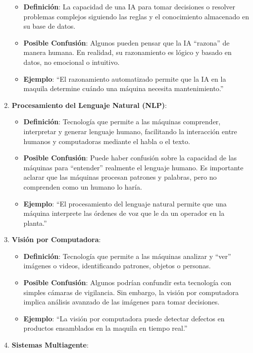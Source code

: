 \documentclass[
  10pt,
  letterpaper,
]{book}
\providecommand{\tightlist}{%
  \setlength{\itemsep}{0pt}\setlength{\parskip}{0pt}}\usepackage{longtable,booktabs,array}
\begin{document}
\begin{enumerate}
  \begin{itemize}
  \tightlist
  \item
    \textbf{Definición}: La capacidad de una IA para tomar decisiones o
    resolver problemas complejos siguiendo las reglas y el conocimiento
    almacenado en su base de datos.
  \item
    \textbf{Posible Confusión}: Algunos pueden pensar que la IA
    ``razona'' de manera humana. En realidad, su razonamiento es lógico
    y basado en datos, no emocional o intuitivo.
  \item
    \textbf{Ejemplo}: ``El razonamiento automatizado permite que la IA
    en la maquila determine cuándo una máquina necesita mantenimiento.''
  \end{itemize}
\item
  \textbf{Procesamiento del Lenguaje Natural (NLP)}:

  \begin{itemize}
  \tightlist
  \item
    \textbf{Definición}: Tecnología que permite a las máquinas
    comprender, interpretar y generar lenguaje humano, facilitando la
    interacción entre humanos y computadoras mediante el habla o el
    texto.
  \item
    \textbf{Posible Confusión}: Puede haber confusión sobre la capacidad
    de las máquinas para ``entender'' realmente el lenguaje humano. Es
    importante aclarar que las máquinas procesan patrones y palabras,
    pero no comprenden como un humano lo haría.
  \item
    \textbf{Ejemplo}: ``El procesamiento del lenguaje natural permite
    que una máquina interprete las órdenes de voz que le da un operador
    en la planta.''
  \end{itemize}
\item
  \textbf{Visión por Computadora}:

  \begin{itemize}
  \tightlist
  \item
    \textbf{Definición}: Tecnología que permite a las máquinas analizar
    y ``ver'' imágenes o videos, identificando patrones, objetos o
    personas.
  \item
    \textbf{Posible Confusión}: Algunos podrían confundir esta
    tecnología con simples cámaras de vigilancia. Sin embargo, la visión
    por computadora implica análisis avanzado de las imágenes para tomar
    decisiones.
  \item
    \textbf{Ejemplo}: ``La visión por computadora puede detectar
    defectos en productos ensamblados en la maquila en tiempo real.''
  \end{itemize}
\item
  \textbf{Sistemas Multiagente}:


\end{enumerate}
\end{document}
